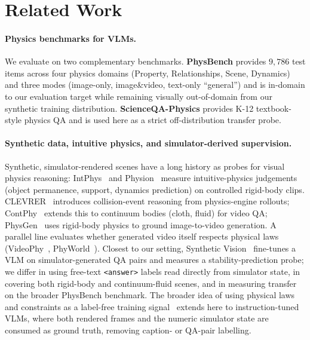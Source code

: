 \documentclass{article}
\begin{document}
\section{Related Work}
\label{sec:related}

\paragraph{Physics benchmarks for VLMs.}
We evaluate on two complementary benchmarks. \textbf{PhysBench}
\cite{physbench2024} provides $9{,}786$ test items across four physics
domains (Property, Relationships, Scene, Dynamics) and three modes
(image-only, image\&video, text-only ``general'') and is in-domain to
our evaluation target while remaining visually out-of-domain from
our synthetic training distribution. \textbf{ScienceQA-Physics}
\cite{scienceqa2022} provides K-12 textbook-style physics QA and is
used here as a strict off-distribution transfer probe.

\paragraph{Synthetic data, intuitive physics, and simulator-derived supervision.}
Synthetic, simulator-rendered scenes have a long history as probes for
visual physics reasoning: IntPhys~\cite{intphys2018} and
Physion~\cite{physion2021} measure intuitive-physics judgements (object
permanence, support, dynamics prediction) on controlled rigid-body
clips. CLEVRER~\cite{clevrer} introduces collision-event reasoning
from physics-engine rollouts; ContPhy~\cite{contphy2024} extends this
to continuum bodies (cloth, fluid) for video QA; PhysGen~\cite{physgen2024}
uses rigid-body physics to ground image-to-video generation. A
parallel line evaluates whether generated video itself respects
physical laws (VideoPhy~\cite{videophy2024}, PhyWorld~\cite{phyworld2024}).
Closest to our setting, Synthetic Vision~\cite{syntheticvision2024}
fine-tunes a VLM on simulator-generated QA pairs and measures a
stability-prediction probe; we differ in using free-text
\texttt{<answer>} labels read directly from simulator state, in
covering both rigid-body and continuum-fluid scenes, and in measuring
transfer on the broader PhysBench benchmark. The broader idea of
using physical laws and constraints as a label-free training
signal~\cite{labelfreephysics2017} extends here to instruction-tuned
VLMs, where both rendered frames and the numeric simulator state
are consumed as ground truth, removing caption- or QA-pair labelling.
\end{document}
